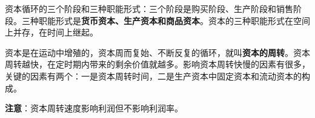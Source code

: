 资本循环的三个阶段和三种职能形式：三个阶段是购买阶段、生产阶段和销售阶段。三种职能形式是\textbf{货币资本、生产资本和商品资本}。资本的三种职能形式在空间上并存，在时间上继起。

资本是在运动中增殖的，资本周而复始、不断反复的循环，就叫\textbf{资本的周转}。资本周转越快，在定时期内带来的剩余价值就越多。影响资本周转快慢的因素有很多，关键的因素有两个：一是资本周转时间，二是生产资本中固定资本和流动资本的构成。

\textbf{{注意}}{：资本周转速度影响利润但不影响利润率。}
